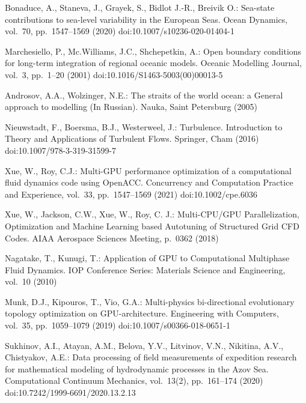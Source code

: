 \documentclass{svproc}
\providecommand{\doi}[1]{doi:\discretionary{}{}{}#1}
\begin{document}
%
%

\begin{thebibliography}{6}
%
Bonaduce, A., Staneva, J., Grayek, S., Bidlot J.-R., Breivik O.:
Sea-state contributions to sea-level variability in the European Seas.
Ocean Dynamics,
vol.~70,
pp.~1547--1569
(2020)
\doi{10.1007/s10236-020-01404-1}

Marchesiello, P., Mc.Williams, J.C., Shchepetkin, A.:
Open boundary conditions for long-term integration of regional oceanic models.
Oceanic Modelling Journal,
vol.~3,
pp.~1--20
(2001)
\doi{10.1016/S1463-5003(00)00013-5}

Androsov, A.A., Wolzinger, N.E.:
The straits of the world ocean: a General approach to modelling (In Russian).
Nauka,
Saint Petersburg
(2005)

Nieuwstadt, F., Boersma, B.J., Westerweel, J.:
Turbulence. Introduction to Theory and Applications of Turbulent Flows.
Springer, Cham
(2016)
\doi{10.1007/978-3-319-31599-7}

Xue, W., Roy, C.J.:
Multi-GPU performance optimization of a computational fluid dynamics code using OpenACC.
Concurrency and Computation Practice and Experience,
vol.~33,
pp.~1547--1569
(2021)
\doi{10.1002/cpe.6036}

Xue, W., Jackson, C.W., Xue, W., Roy, C. J.:
Multi-CPU/GPU Parallelization, Optimization and Machine Learning based Autotuning of Structured Grid CFD Codes.
AIAA Aerospace Sciences Meeting,
p.~0362
(2018)

Nagatake, T., Kunugi, T.:
Application of GPU to Computational Multiphase Fluid Dynamics.
IOP Conference Series: Materials Science and Engineering,
vol.~10
(2010)

Munk, D.J., Kipouros, T., Vio, G.A.:
Multi-physics bi-directional evolutionary topology optimization on GPU-architecture.
Engineering with Computers,
vol.~35,
pp.~1059--1079
(2019)
\doi{10.1007/s00366-018-0651-1}

Sukhinov, A.I., Atayan, A.M., Belova, Y.V., Litvinov, V.N., Nikitina, A.V., Chistyakov, A.E.:
Data processing of field measurements of expedition research for mathematical modeling of hydrodynamic processes in the Azov Sea.
Computational Continuum Mechanics,
vol.~13(2),
pp.~161--174
(2020)
\doi{10.7242/1999-6691/2020.13.2.13}


\end{thebibliography}
\end{document}
